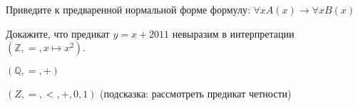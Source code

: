 \begin{ptask}{38}
    Приведите к предваренной нормальной форме формулу:
    $\forall x A(x) \rightarrow \forall x B(x)$
\end{ptask}

\begin{ptask}{40}
    Докажите, что предикат $y = x + 2011$ невыразим в интерпретации
    $(\mathbb{Z}, =, x \mapsto x^2)$.
\end{ptask}

\begin{ptask}{42}
    $(\mathbb{Q}, =, +)$
\end{ptask}

\begin{ptask}{43}
    $(Z, =, <, +, 0, 1)$ (подсказка: рассмотреть предикат четности)
\end{ptask}